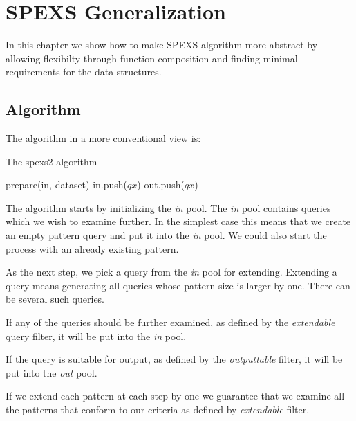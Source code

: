 \chapter{SPEXS Generalization}
\label{c:generalization}

In this chapter we show how to make SPEXS algorithm more abstract by allowing flexibilty through function composition and finding minimal requirements for the data-structures.

\section{Algorithm}

The algorithm in a more conventional view is:

\begin{algorithm}[H]
	\caption{The spexs2 algorithm}
\begin{algorithmic}[1]
	\Statex
		\State prepare(in, dataset)
					\State in.push($qx$)
						\State out.push($qx$)
					\EndIf
				\EndIf
			\EndFor
		\EndWhile
	\EndFunction
\end{algorithmic}
\end{algorithm}

The algorithm starts by initializing the \emph{in} pool. The \emph{in} pool contains queries which we wish to examine further. In the simplest case this means that we create an empty pattern query and put it into the \emph{in} pool. We could also start the process with an already existing pattern.

As the next step, we pick a query from the \emph{in} pool for extending. Extending a query means generating all queries whose pattern size is larger by one. There can be several such queries.

If any of the queries should be further examined, as defined by the \emph{extendable} query filter, it will be put into the \emph{in} pool.

If the query is suitable for output, as defined by the \emph{outputtable} filter, it will be put into the \emph{out} pool. 

If we extend each pattern at each step by one we guarantee that we examine all the patterns that conform to our criteria as defined by \emph{extendable} filter.

